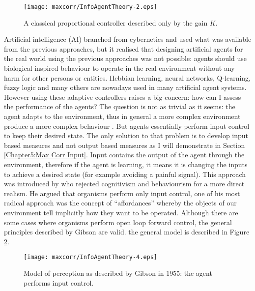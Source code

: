 \begin{figure}[ht]
  \begin{center}
    \texttt{[image: maxcorr/InfoAgentTheory-2.eps]}
    \caption[Classical proportional controller]{
	     A classical proportional controller described only by the gain $K$.
	      \label{Figure:maxcorr:PID}}
  \end{center}
\end{figure}
Artificial intelligence (AI) branched from cybernetics and used what was available
from the previous approaches, but it realised that designing artificial agents
for the real world using the previous
approaches was not possible: agents should use biological inspired behaviour to
operate in the real environment without any harm for other persons or entities.
Hebbian learning, neural networks, Q-learning, fuzzy logic and many others are
nowadays used in many artificial agent systems. However using these adaptive
controllers raises a big concern: how can I assess the performance of the agents?
The question is not as trivial as it seems: the agent adapts to the environment,
thus in general a more complex environment produce a more complex
behaviour \citep{NolfiInteraction}. 
But agents essentially perform input control to keep their desired state.
The only solution to that problem is to develop input based measures and not 
output based measures as I will demonstrate in Section \ref{Chapter5:Max Corr Input}.
Input contains the output of the agent through the environment,
therefore if the agent is learning, it means it is changing the inputs to achieve
a desired state (for example avoiding a painful signal).
This approach was introduced by \citet{Gibson1955:learning} who rejected
cognitivism and behaviourism for a more direct realism. 
He argued that organisms perform only input control, one of his most radical
 approach was the concept of ``affordances'' whereby the objects of our environment
 tell implicitly how they want to be operated.
Although there are some cases where organisms perform open loop forward control,
 the general principles described by Gibson are valid.
the general model is described in Figure \ref{Figure:maxcorr:Gibson}.

\begin{figure}[ht]
  \begin{center}
    \texttt{[image: maxcorr/InfoAgentTheory-4.eps]}
    \caption[Gibson cybernetic approach]{
	     Model of perception as described by Gibson in 1955: the agent performs input control.
	     \label{Figure:maxcorr:Gibson}}
  \end{center}
\end{figure}

